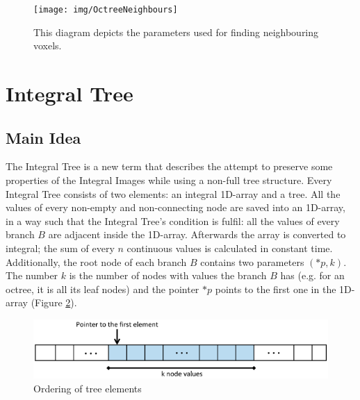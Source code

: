 \documentclass{subfiles}
\begin{document}
\begin{figure}[!htbp]
	\centering
	\texttt{[image: img/OctreeNeighbours]}
	\caption{This diagram depicts the parameters used for finding neighbouring voxels.}
	\label{fig:OctreeNeighbours}
\end{figure}


\newpage

\section{Integral Tree}\label{sec:ITopt}
\par 

\subsection{Main Idea }

\par The Integral Tree is a new term that describes the attempt to preserve some properties of the Integral Images while using a non-full tree structure. Every Integral Tree consists of two elements: an integral 1D-array and a tree. All the values of every non-empty and non-connecting node are saved into an 1D-array, in a way such that the Integral Tree's condition is fulfil: all the values of every branch $B$ are adjacent inside the 1D-array. Afterwards the array is converted to integral; the sum of every $n$ continuous values is calculated in constant time. Additionally, the root node of each branch $B$ contains two parameters $(*p, k)$. The number $k$ is the number of nodes with values the branch $B$ has (e.g. for an octree, it is all its leaf nodes) and the pointer $*p$ points to the first one in the 1D-array (Figure \ref{fig:IntegralTreeMainIdea}).

\begin{figure}[!htbp]
	\centering
	\includegraphics[width=5.5in]{img/IntegralTreeMainIdea}
	\caption{Ordering of tree elements}
	\label{fig:IntegralTreeMainIdea}
\end{figure}
\end{document}
